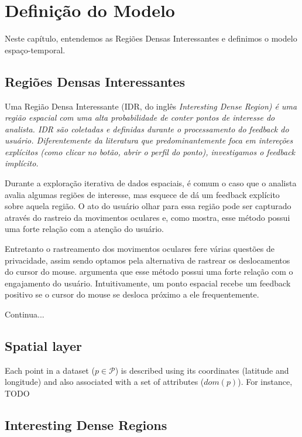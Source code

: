 \chapter{Definição do Modelo}
\label{chap:modelo}

Neste capítulo, entendemos as Regiões Densas Interessantes e definimos o modelo espaço-temporal.

\section{Regiões Densas Interessantes}

Uma Região Densa Interessante (IDR, do inglês \em{Interesting Dense Region}) é uma região espacial com uma alta probabilidade de conter pontos de interesse do analista. IDR são coletadas e definidas durante o processamento do feedback do usuário. Diferentemente da literatura que predominantemente foca em intereções explícitos (como clicar no botão, abrir o perfil do ponto), investigamos o feedback implícito.

Durante a exploração iterativa de dados espaciais, é comum o caso que o analista avalia algumas regiões de interesse, mas esquece de dá um feedback explícito sobre aquela região. O ato do usuário olhar para essa região pode ser capturado através do rastreio da movimentos oculares e, como  mostra, esse método possui uma forte relação com a atenção do usuário.

Entretanto o rastreamento dos movimentos oculares fere várias questões de privacidade, assim sendo optamos pela alternativa de rastrear os deslocamentos do cursor do mouse.  argumenta que esse método possui uma forte relação com o engajamento do usuário. Intuitivamente, um ponto espacial recebe um feedback positivo se o cursor do mouse se desloca próximo a ele frequentemente.

Continua...

\section{Spatial layer}

Each point in a dataset ($p \in \mathcal{P}$) is described using its coordinates (latitude and longitude) and also associated with a set of attributes ($dom(p)$). For instance, TODO

\section{Interesting Dense Regions}

